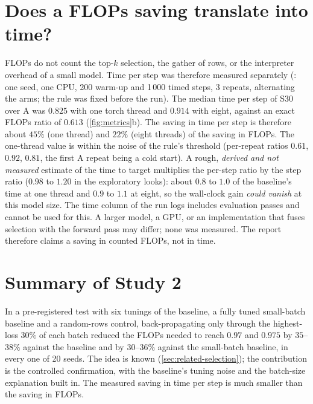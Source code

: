 \section{Does a FLOPs saving translate into time?}\label{sec:wallclock}
FLOPs do not count the top-$k$ selection, the gather of rows, or the interpreter overhead of a small model. Time per step was therefore measured separately (\tierE{}: one seed, one CPU, 200 warm-up and 1\,000 timed steps, 3 repeats, alternating the arms; the rule was fixed before the run). The median time per step of S30 over A was $0.825$ with one torch thread and $0.914$ with eight, against an exact FLOPs ratio of $0.613$ (\cref{fig:metrics}b). The saving in time per step is therefore about $45\%$ (one thread) and $22\%$ (eight threads) of the saving in FLOPs. The one-thread value is within the noise of the rule's threshold (per-repeat ratios $0.61$, $0.92$, $0.81$, the first A repeat being a cold start). A rough, \emph{derived and not measured} estimate of the time to target multiplies the per-step ratio by the step ratio ($0.98$ to $1.20$ in the exploratory looks): about $0.8$ to $1.0$ of the baseline's time at one thread and $0.9$ to $1.1$ at eight, so the wall-clock gain \emph{could vanish} at this model size. The time column of the run logs includes evaluation passes and cannot be used for this. A larger model, a GPU, or an implementation that fuses selection with the forward pass may differ; none was measured. The report therefore claims a saving in counted FLOPs, not in time.

\section{Summary of Study 2}
In a pre-registered test with six tunings of the baseline, a fully tuned small-batch baseline and a random-rows control, back-propagating only through the highest-loss $30\%$ of each batch reduced the FLOPs needed to reach $0.97$ and $0.975$ by $35$--$38\%$ against the baseline and by $30$--$36\%$ against the small-batch baseline, in every one of 20 seeds. The idea is known (\cref{sec:related-selection}); the contribution is the controlled confirmation, with the baseline's tuning noise and the batch-size explanation built in. The measured saving in time per step is much smaller than the saving in FLOPs.
